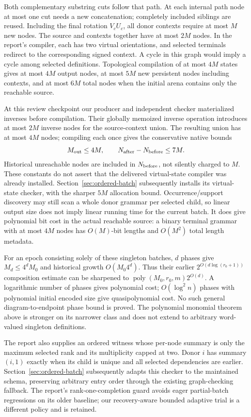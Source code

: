 Both complementary substring cuts follow that path. At each internal path
node at most one cut needs a new concatenation; completely included siblings
are reused. Including the final rotation $V_cU_c$, all donor contexts require
at most $M$ new nodes. The source and contexts together have at most $2M$
nodes. In the report's compiler, each has two virtual orientations, and
selected terminals redirect to the corresponding signed context. A cycle in
this graph would imply a cycle among selected definitions. Topological
compilation of at most $4M$ states gives at most $4M$ output nodes, at most
$5M$ new persistent nodes including contexts, and at most $6M$ total nodes
when the initial arena contains only the reachable source.

At this review checkpoint our producer and independent checker materialized inverses before
compilation. Their globally memoized inverse operation introduces at most
$2M$ inverse nodes for the source-context union. The resulting union has at
most $4M$ nodes; compiling each once gives the conservative native bounds
\[
 M_{\rm out}\le4M,\qquad N_{\rm after}-N_{\rm before}\le7M.
\]
Historical unreachable nodes are included in $N_{\rm before}$, not silently
charged to $M$. These constants do not assert that the delivered virtual-state
compiler was already installed. Section~\ref{sec:ordered-batch} subsequently
installs its virtual-state checker, with the sharper $5M$ allocation bound.
Occurrence/support discovery may still scan a
whole donor grammar per selected child, so linear output size does not imply
linear running time for the current batch. It does give polynomial bit cost
in the actual reachable source: a binary terminal grammar with at most $4M$
nodes has $O(M)$-bit lengths and $O(M^2)$ total length metadata.

For an epoch consisting solely of these singleton batches, $d$ phases give
$M_d\le4^dM_0$ and historical growth $O(M_0 4^d)$. Thus their earlier
$2^{O(d\log(r_0+1))}$ composition estimate can be sharpened to
$\operatorname{poly}(M_0,r_0,m)2^{O(d)}$. A logarithmic number of phases gives
polynomial cost; $O(\log^2 n)$ phases with polynomial initial encoded size give
quasipolynomial cost. No such general diagram-to-endpoint phase bound is
proved. The polynomial monomial theorem above is stronger on its narrower
class and does not extend to arbitrary word-valued singleton definitions.

The report also supplies an ordered witness whose per-node summary is only
the maximum selected rank and its multiplicity capped at two. Donor $i$ has
summary $(i,1)$ exactly when its child is unique and all selected dependencies
are earlier. Section~\ref{sec:ordered-batch} subsequently adapts this checker
to the maintained schema, preserving arbitrary entry order through the
existing graph-checking fallback. The report's rank-one-completion
guard avoids eager partial-batch regressions on its older baseline; our
recovery-aware bounded adaptive trial is a different policy and is retained.

